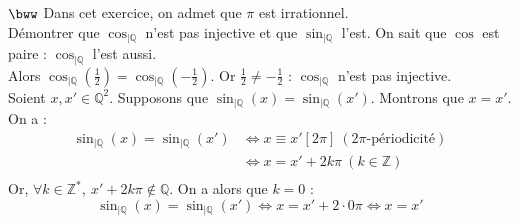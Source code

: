 \documentclass[11pt]{article}
\begin{document}
\begin{exercice}{$\bww$}{}
    Dans cet exercice, on admet que $\pi$ est irrationnel.\\
    Démontrer que $\cos_{|\mathbb{Q}}$ n'est pas injective et que $\sin_{|\mathbb{Q}}$ l'est.
    \tcblower
    On sait que $\cos$ est paire : $\cos_{|\mathbb{Q}}$ l'est aussi.\\
    Alors $\cos_{|\mathbb{Q}}(\frac{1}{2}) = \cos_{|\mathbb{Q}}(-\frac{1}{2})$. Or $\frac{1}{2} \neq -\frac{1}{2}$ : $\cos_{|\mathbb{Q}}$ n'est pas injective.\\[0.2cm]
    Soient $x,x'\in\mathbb{Q}^2$. Supposons que $\sin_{|\mathbb{Q}}(x) = \sin_{|\mathbb{Q}}(x')$. Montrons que $x=x'$.\\
    On a :
    \begin{align*}
        \sin_{|\mathbb{Q}}(x) = \sin_{|\mathbb{Q}}(x') &\iff x \equiv x' [2\pi] ~ (2\pi\text{-périodicité}) \\
        &\iff x = x' + 2k\pi ~ (k\in\mathbb{Z})\\
    \end{align*}
    Or, $\forall{k\in\mathbb{Z}^*}, ~ x' + 2k\pi \notin \mathbb{Q}$. On a alors que $k=0$ :
    \begin{equation*}
        \sin_{|\mathbb{Q}}(x) = \sin_{|\mathbb{Q}}(x') \iff x = x' + 2\cdot0\pi \iff x = x'
    \end{equation*}
\end{exercice}
\end{document}
